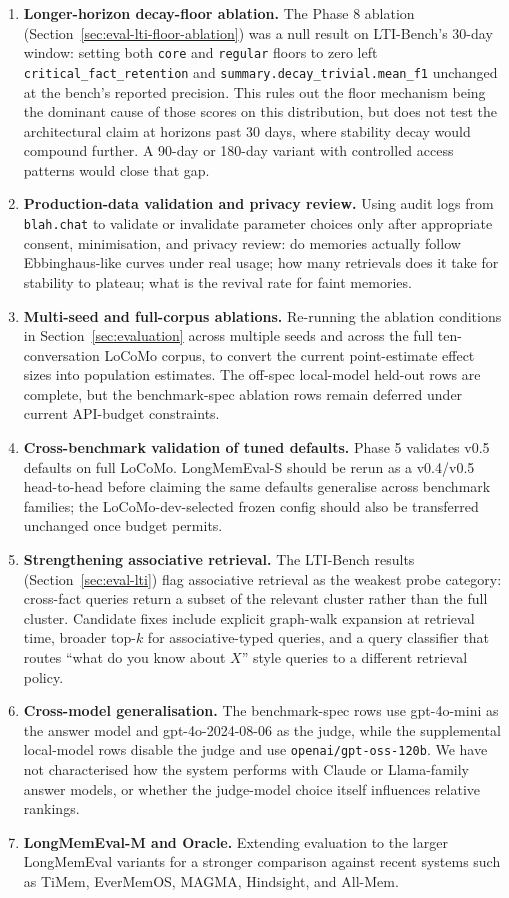 \documentclass[11pt,a4paper]{article}
\begin{document}
\begin{enumerate}
    \item \textbf{Longer-horizon decay-floor ablation.} The Phase 8 ablation (Section~\ref{sec:eval-lti-floor-ablation}) was a null result on LTI-Bench's 30-day window: setting both \texttt{core} and \texttt{regular} floors to zero left \texttt{critical\_fact\_retention} and \texttt{summary.decay\_trivial.mean\_f1} unchanged at the bench's reported precision. This rules out the floor mechanism being the dominant cause of those scores on this distribution, but does not test the architectural claim at horizons past 30 days, where stability decay would compound further. A 90-day or 180-day variant with controlled access patterns would close that gap.
    \item \textbf{Production-data validation and privacy review.} Using audit logs from \texttt{blah.chat} to validate or invalidate parameter choices only after appropriate consent, minimisation, and privacy review: do memories actually follow Ebbinghaus-like curves under real usage; how many retrievals does it take for stability to plateau; what is the revival rate for faint memories.
    \item \textbf{Multi-seed and full-corpus ablations.} Re-running the ablation conditions in Section~\ref{sec:evaluation} across multiple seeds and across the full ten-conversation LoCoMo corpus, to convert the current point-estimate effect sizes into population estimates. The off-spec local-model held-out rows are complete, but the benchmark-spec ablation rows remain deferred under current API-budget constraints.
    \item \textbf{Cross-benchmark validation of tuned defaults.} Phase 5 validates v0.5 defaults on full LoCoMo. LongMemEval-S should be rerun as a v0.4/v0.5 head-to-head before claiming the same defaults generalise across benchmark families; the LoCoMo-dev-selected frozen config should also be transferred unchanged once budget permits.
    \item \textbf{Strengthening associative retrieval.} The LTI-Bench results (Section~\ref{sec:eval-lti}) flag associative retrieval as the weakest probe category: cross-fact queries return a subset of the relevant cluster rather than the full cluster. Candidate fixes include explicit graph-walk expansion at retrieval time, broader top-$k$ for associative-typed queries, and a query classifier that routes ``what do you know about $X$'' style queries to a different retrieval policy.
    \item \textbf{Cross-model generalisation.} The benchmark-spec rows use gpt-4o-mini as the answer model and gpt-4o-2024-08-06 as the judge, while the supplemental local-model rows disable the judge and use \texttt{openai/gpt-oss-120b}. We have not characterised how the system performs with Claude or Llama-family answer models, or whether the judge-model choice itself influences relative rankings.
    \item \textbf{LongMemEval-M and Oracle.} Extending evaluation to the larger LongMemEval variants for a stronger comparison against recent systems such as TiMem, EverMemOS, MAGMA, Hindsight, and All-Mem.
\end{enumerate}
\end{document}
